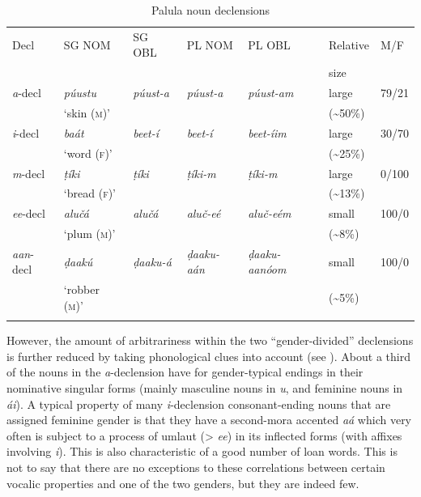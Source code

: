 \documentclass[output=collectionpaper]{langsci/langscibook}
\begin{document}
\begin{table}[htb]
\small
\begin{tabularx}{\textwidth}{lXlllll}
\lsptoprule
Decl & SG NOM & SG OBL & PL NOM & PL OBL & Relative & \textsc{M/}\textsc{F} \\
&&&&& size & \\
\midrule
\textit{a}{}-decl & \textit{púustu}  & \itshape púust{}-a & \itshape púust{}-a & \itshape púust{}-am & large  & 79/21\\
& `skin (\textsc{m})' &&&& ({\textasciitilde}50\%) &\\
\textit{i}{}-decl & \textit{baát}  & \itshape beet{}-í & \itshape beet-í & \itshape beet-íim & large  & 30/70\\
& `word (\textsc{f})' &&&& ({\textasciitilde}25\%) \\
\textit{m}{}-decl & \textit{ṭíki}  & \itshape ṭíki & \itshape ṭíki-m & \itshape ṭíki-m & large  & 0/100\\
& `bread (\textsc{f})' &&&& ({\textasciitilde}13\%) \\
\textit{ee}{}-decl & \textit{alučá}  & \itshape alučá & \itshape aluč-eé & \itshape aluč-eém & small  & 100/0\\
& `plum (\textsc{m})' &&&& ({\textasciitilde}8\%) \\
\textit{aan}{}-decl & \textit{ḍaakú}  & \itshape ḍaaku-á & \itshape ḍaaku-aán & \itshape ḍaaku-aanóom & small  & 100/0\\
& `robber (\textsc{m})' &&&& ({\textasciitilde}5\%) \\
\lspbottomrule
\end{tabularx}
\caption{Palula noun declensions}
\label{tab:Lilje:7}
\end{table}


However, the amount of arbitrariness within the two ``gender-divided'' declensions is further reduced by taking phonological clues into account (see ). About a third of the nouns in the \textit{a}{}-declension have for  gender-typical endings in their nominative singular forms (mainly masculine nouns in \textit{u}, and feminine nouns in \textit{\'ai}). A typical property of many \textit{i}{}-declension consonant-ending nouns that are assigned feminine gender is that they have a second-mora accented \textit{aá} which very often is subject to a process of umlaut (> \textit{ee}) in its inflected forms (with affixes involving \textit{i}). This is also characteristic of a good number of loan words. This is not to say that there are no exceptions to these correlations between certain vocalic properties and one of the two genders, but they are indeed few.
\end{document}

